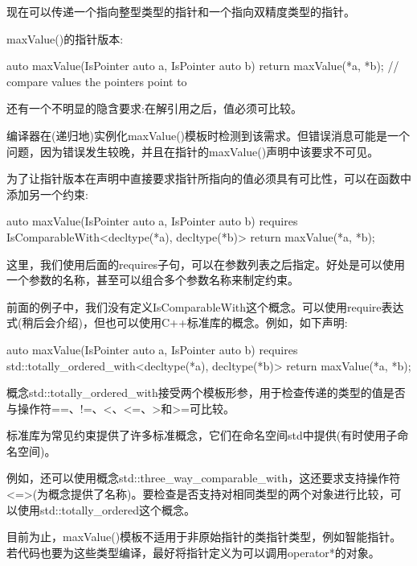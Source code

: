 现在可以传递一个指向整型类型的指针和一个指向双精度类型的指针。


maxValue()的指针版本:

\begin{cpp}
auto maxValue(IsPointer auto a, IsPointer auto b)
{
	return maxValue(*a, *b); // compare values the pointers point to
}
\end{cpp}

还有一个不明显的隐含要求:在解引用之后，值必须可比较。

编译器在(递归地)实例化maxValue()模板时检测到该需求。但错误消息可能是一个问题，因为错误发生较晚，并且在指针的maxValue()声明中该要求不可见。

为了让指针版本在声明中直接要求指针所指向的值必须具有可比性，可以在函数中添加另一个约束:

\begin{cpp}
auto maxValue(IsPointer auto a, IsPointer auto b)
requires IsComparableWith<decltype(*a), decltype(*b)>
{
	return maxValue(*a, *b);
}
\end{cpp}

这里，我们使用后面的requires子句，可以在参数列表之后指定。好处是可以使用一个参数的名称，甚至可以组合多个参数名称来制定约束。


前面的例子中，我们没有定义IsComparableWith这个概念。可以使用require表达式(稍后会介绍)，但也可以使用C++标准库的概念。例如，如下声明:

\begin{cpp}
auto maxValue(IsPointer auto a, IsPointer auto b)
requires std::totally_ordered_with<decltype(*a), decltype(*b)>
{
	return maxValue(*a, *b);
}
\end{cpp}

概念std::totally\_ordered\_with接受两个模板形参，用于检查传递的类型的值是否与操作符==、!=、<、<=、>和>=可比较。

标准库为常见约束提供了许多标准概念，它们在命名空间std中提供(有时使用子命名空间)。

例如，还可以使用概念std::three\_way\_comparable\_with，这还要求支持操作符<=>(为概念提供了名称)。要检查是否支持对相同类型的两个对象进行比较，可以使用std::totally\_ordered这个概念。


目前为止，maxValue()模板不适用于非原始指针的类指针类型，例如智能指针。若代码也要为这些类型编译，最好将指针定义为可以调用operator*的对象。

